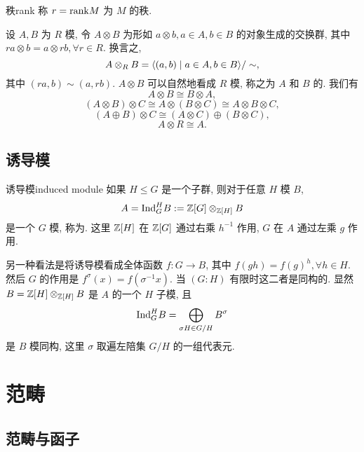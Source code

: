 \begin{definition}{秩}{rank}
称 $r={\mathrm{rank}} M$ 为 $M$ 的秩.
\end{definition}

\begin{example}
设 $A,B$ 为 $R$ 模, 令 $A\otimes B$ 为形如 $a\otimes b, a\in A, b\in B$ 的对象生成的交换群, 其中 $ra\otimes b=a\otimes rb, \forall r\in R$. 换言之,
  \[A\otimes_R B=\langle{(a,b)\mid a\in A,b\in B}\rangle/\sim,\]
其中 $(ra,b)\sim (a,rb)$. $A\otimes B$ 可以自然地看成 $R$ 模, 称之为 $A$ 和 $B$ 的. 我们有
  \[A\otimes B\cong B\otimes A,\]
  \[(A\otimes B)\otimes C\cong A\otimes(B\otimes C)\cong A\otimes B\otimes C,\]
  \[(A\oplus B)\otimes C\cong (A\otimes C)\oplus(B\otimes C),\]
  \[A\otimes R\cong A.\]
\end{example}

\subsection{诱导模}

\begin{definition}{诱导模}{induced module}
如果 $H\leqslant G$ 是一个子群, 则对于任意 $H$ 模 $B$,
  \[A={\mathrm{Ind}}_G^H B:={\mathbb{Z}}[G]\otimes_{{\mathbb{Z}}[H]} B\] 
是一个 $G$ 模, 称为. 这里 ${\mathbb{Z}}[H]$ 在 ${\mathbb{Z}}[G]$ 通过右乘 $h^{-1}$ 作用, $G$ 在 $A$ 通过左乘 $g$ 作用.

另一种看法是将诱导模看成全体函数 $f:G\to B$, 其中 $f(gh)=f(g)^h,\forall h\in H$. 然后 $G$ 的作用是 $f^\sigma(x)=f(\sigma^{-1} x)$. 当 $(G:H)$ 有限时这二者是同构的. 显然 $B={\mathbb{Z}}[H]\otimes_{{\mathbb{Z}}[H]} B$ 是 $A$ 的一个 $H$ 子模, 且
  \[{\mathrm{Ind}}_G^H B=\bigoplus_{\sigma H\in G/H} B^\sigma\]
是 $B$ 模同构, 这里 $\sigma$ 取遍左陪集 $G/H$ 的一组代表元.
\end{definition}


\section{范畴}\label{sec:category}

\subsection{范畴与函子}\label{subsec:categories_and_functors}

